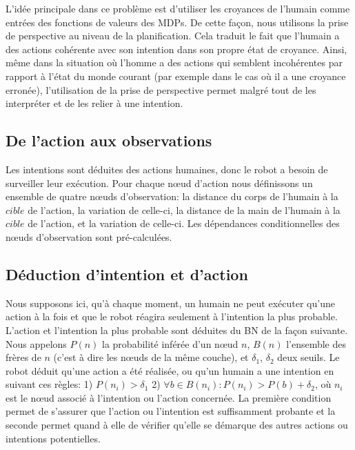 \documentclass[a4paper,11pt,twoside]{StyleThese}
\begin{document}
L'idée principale dans ce problème est d'utiliser les croyances de l'humain comme entrées des fonctions de valeurs des MDPs. De cette façon, nous utilisons la prise de perspective au niveau de la planification. Cela traduit le fait que l'humain a des actions cohérente avec son intention dans son propre état de croyance. Ainsi, même dans la situation où l'homme a des actions qui semblent incohérentes par rapport à l'état du monde courant (par exemple dans le cas où il a une croyance erronée), l'utilisation de la prise de perspective permet malgré tout de les interpréter et de les relier à une intention.


\subsection{De l'action aux observations}
\label{sec:action}
Les intentions sont déduites des actions humaines, donc le robot a besoin de surveiller leur exécution. Pour chaque nœud d'action nous définissons un ensemble de quatre nœuds d'observation: la distance du corps de l'humain à la $cible$ de l'action, la variation de celle-ci, la distance de la main de l'humain à la $cible$ de l'action, et la variation de celle-ci.
Les dépendances conditionnelles des nœuds d'observation sont pré-calculées.

\subsection{Déduction d'intention et d'action}
\label{sec:intentionactioninf}
Nous supposons ici, qu'à chaque moment, un humain ne peut exécuter qu'une action à la fois et que le robot réagira seulement à l'intention la plus probable. L'action et l'intention la plus probable sont déduites du BN de la façon suivante. Nous appelons $P(n)$ la probabilité inférée d'un nœud  $n$, $B(n)$ l'ensemble des frères de $n$ (c'est à dire les nœuds de la même couche), et $\delta_1$, $\delta_2$ deux seuils. Le robot déduit qu'une action a été réalisée, ou qu'un humain a une intention en suivant ces règles: 1) \(P(n_i)>\delta_1\) 2) \(\forall b \in B(n_i): P(n_i)>P(b)+\delta_2\), où $n_i$ est le nœud associé à l'intention ou l'action concernée.
La première condition permet de s'assurer que l'action ou l'intention est suffisamment probante et la seconde permet quand à elle de vérifier qu'elle se démarque des autres actions ou intentions potentielles.
\end{document}
